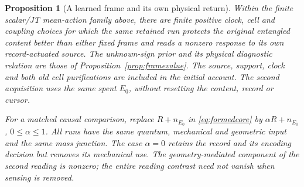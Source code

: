 \documentclass[12pt]{article}
\newtheorem{proposition}[theorem]{Proposition}
\theoremstyle{definition}
\theoremstyle{remark}
\begin{document}
\begin{proposition}[A learned frame and its own physical return]
\label{prop:learned-self-return}
Within the finite scalar/JT mean-action family above, there are finite positive
clock, cell and coupling choices for which the same retained run
protects the original entangled content better than either fixed
frame and reads a nonzero response to its own record-actuated source.
The unknown-sign prior and its physical diagnostic relation are those
of Proposition~\ref{prop:framevalue}. The source, support, clock and
both old cell purifications are included in the initial account.
The second acquisition uses the same spent $E_0$, without resetting
the content, record or cursor.

For a matched causal comparison, replace $R+n_{E_0}$ in
\eqref{eq:formedcore} by $\alpha R+n_{E_0}$, $0\le\alpha\le1$.
All runs have the same quantum, mechanical and geometric input and
the same mass junction. The case $\alpha=0$ retains the record and
its encoding decision but removes its mechanical use.
The geometry-mediated component of the second reading is nonzero;
the entire reading contrast need not vanish when sensing is removed.
\end{proposition}
\end{document}
